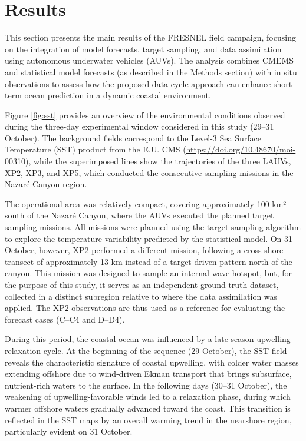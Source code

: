 \section{Results}
This section presents the main results of the FRESNEL field campaign, focusing on the integration of model forecasts, target sampling, and data assimilation using autonomous underwater vehicles (AUVs). The analysis combines CMEMS and statistical model forecasts (as described in the Methods section) with in situ observations to assess how the proposed data-cycle approach can enhance short-term ocean prediction in a dynamic coastal environment.

Figure \ref{fig:sst} provides an overview of the environmental conditions observed during the three-day experimental window considered in this study (29–31 October). The background fields correspond to the Level-3 Sea Surface Temperature (SST) product from the E.U. CMS (\url{https://doi.org/10.48670/moi-00310}), while the superimposed lines show the trajectories of the three LAUVs, XP2, XP3, and XP5, which conducted the consecutive sampling missions in the Nazaré Canyon region.

The operational area was relatively compact, covering approximately 100 km² south of the Nazaré Canyon, where the AUVs executed the planned target sampling missions. All missions were planned using the target sampling algorithm to explore the temperature variability predicted by the statistical model. On 31 October, however, XP2 performed a different mission, following a cross-shore transect of approximately 13 km instead of a target-driven pattern north of the canyon. This mission was designed to sample an internal wave hotspot, but, for the purpose of this study, it serves as an independent ground-truth dataset, collected in a distinct subregion relative to where the data assimilation was applied. The XP2 observations are thus used as a reference for evaluating the forecast cases (C–C4 and D–D4).

During this period, the coastal ocean was influenced by a late-season upwelling–relaxation cycle. At the beginning of the sequence (29 October), the SST field reveals the characteristic signature of coastal upwelling, with colder water masses extending offshore due to wind-driven Ekman transport that brings subsurface, nutrient-rich waters to the surface. In the following days (30–31 October), the weakening of upwelling-favorable winds led to a relaxation phase, during which warmer offshore waters gradually advanced toward the coast. This transition is reflected in the SST maps by an overall warming trend in the nearshore region, particularly evident on 31 October.


